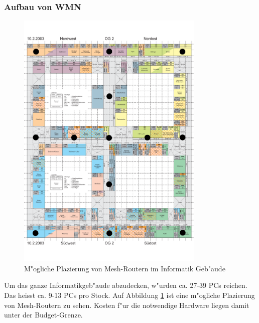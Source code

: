 \subsubsection{Aufbau von WMN}
\label{sec:Aufbau}

\begin{figure}[H]
\centering
\includegraphics[width=0.8\textwidth]{images/plan.pdf}
\caption{M"ogliche Plazierung von Mesh-Routern im Informatik Geb"aude}
\label{fig:plan}
\end{figure}
	
Um das ganze Informatikgeb"aude abzudecken, w"urden ca. 27-39 PCs reichen.
Das heisst ca. 9-13 PCs pro Stock.  Auf Abbildung \ref{fig:plan} ist
eine m"ogliche Plazierung von Mesh-Routern zu sehen.  Kosten f"ur die
notwendige Hardware liegen damit unter der Budget-Grenze.

